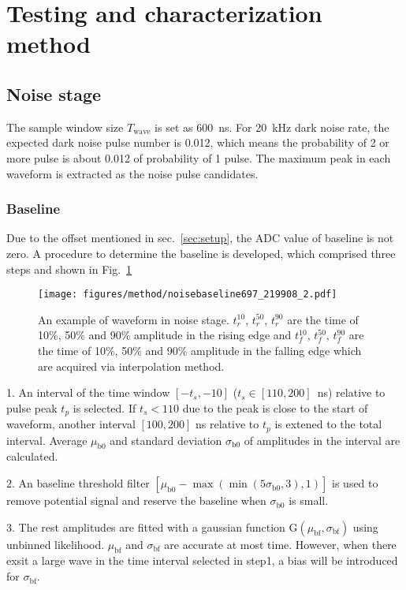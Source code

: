 \section{Testing and characterization method}
\label{Method}

\subsection{Noise stage}
The sample window size $T_{\mathrm{wave}}$ is set as \SI{600}{ns}. For \SI{20}{kHz} dark noise rate, the expected dark noise pulse number is 0.012, which means the probability of 2 or more pulse is about 0.012 of probability of 1 pulse. The maximum peak in each waveform is extracted as the noise pulse candidates.
\subsubsection{Baseline}
Due to the offset mentioned in sec.~\ref{sec:setup}, the ADC value of baseline is not zero. A procedure to determine the baseline is developed, which comprised three steps and shown in Fig.~\ref{fig:baseline1}
\begin{figure}[!htbp]
    \centering
    \texttt{[image: figures/method/noisebaseline697\_219908\_2.pdf]}
    \caption{An example of waveform in noise stage. $t^{10}_r$, $t^{50}_r$, $t^{90}_r$ are the time of 10\%, 50\% and 90\% amplitude in the rising edge and $t^{10}_f$, $t^{50}_f$, $t^{90}_f$ are the time of 10\%, 50\% and 90\% amplitude in the falling edge which are acquired via interpolation method.}
    \label{fig:baseline1}
\end{figure}

1. An interval of the time window $[-t_s,-10]$ ($t_s\in[110,200]$\ ns) relative to pulse peak $t_p$ is selected. If $t_s<110$ due to the peak is close to the start of waveform, another interval $[100,200]$ ns relative to $t_p$ is extened to the total interval. Average $\mu_{\mathrm{b0}}$ and standard deviation $\sigma_{\mathrm{b0}}$ of amplitudes in the interval are calculated.

2. An baseline threshold filter $[\mu_{\mathrm{b0}}-\max(\min(5\sigma_{\mathrm{b0}},3),1)]$ is used to remove potential signal and reserve the baseline when $\sigma_{\mathrm{b0}}$ is small.

3. The rest amplitudes are fitted with a gaussian function G$(\mu_{\mathrm{bf}},\sigma_{\mathrm{bf}})$ using unbinned likelihood. $\mu_{\mathrm{bf}}$ and $\sigma_{\mathrm{bf}}$ are accurate at most time. However, when there exsit a large wave in the time interval selected in step1, a bias will be introduced for $\sigma_{\mathrm{bf}}$.

